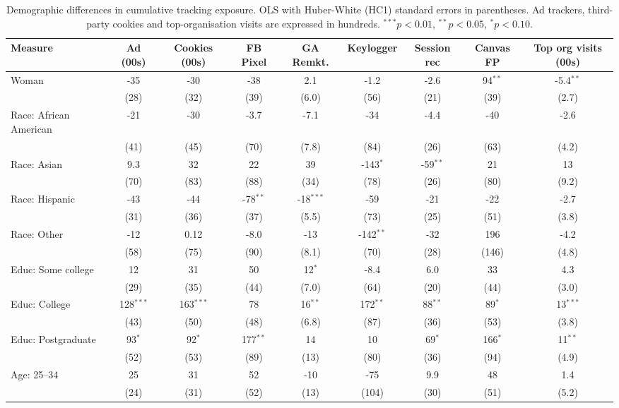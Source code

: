 \begin{table}[htbp]
\centering
\caption{Demographic differences in cumulative tracking exposure. OLS with Huber-White (HC1) standard errors in parentheses. Ad trackers, third-party cookies and top-organisation visits are expressed in hundreds. $^{***}p<0.01$, $^{**}p<0.05$, $^{*}p<0.10$.}
\label{tab:demo_differences_cum_exposure}
\begin{adjustbox}{max width=\textwidth}
\begin{tabular}{lcccccccc}
\toprule
Measure & Ad (00s) & Cookies (00s) & FB Pixel & GA Remkt. & Keylogger & Session rec & Canvas FP & Top org visits (00s) \\
\midrule
Woman & -35 & -30 & -38 & 2.1 & -1.2 & -2.6 & 94$^{**}$ & -5.4$^{**}$ \\
 & (28) & (32) & (39) & (6.0) & (56) & (21) & (39) & (2.7) \\
Race: African American & -21 & -30 & -3.7 & -7.1 & -34 & -4.4 & -40 & -2.6 \\
 & (41) & (45) & (70) & (7.8) & (84) & (26) & (63) & (4.2) \\
Race: Asian & 9.3 & 32 & 22 & 39 & -143$^{*}$ & -59$^{**}$ & 21 & 13 \\
 & (70) & (83) & (88) & (34) & (78) & (26) & (80) & (9.2) \\
Race: Hispanic & -43 & -44 & -78$^{**}$ & -18$^{***}$ & -59 & -21 & -22 & -2.7 \\
 & (31) & (36) & (37) & (5.5) & (73) & (25) & (51) & (3.8) \\
Race: Other & -12 & 0.12 & -8.0 & -13 & -142$^{**}$ & -32 & 196 & -4.2 \\
 & (58) & (75) & (90) & (8.1) & (70) & (28) & (146) & (4.8) \\
Educ: Some college & 12 & 31 & 50 & 12$^{*}$ & -8.4 & 6.0 & 33 & 4.3 \\
 & (29) & (35) & (44) & (7.0) & (64) & (20) & (44) & (3.0) \\
Educ: College & 128$^{***}$ & 163$^{***}$ & 78 & 16$^{**}$ & 172$^{**}$ & 88$^{**}$ & 89$^{*}$ & 13$^{***}$ \\
 & (43) & (50) & (48) & (6.8) & (87) & (36) & (53) & (3.8) \\
Educ: Postgraduate & 93$^{*}$ & 92$^{*}$ & 177$^{**}$ & 14 & 10 & 69$^{*}$ & 166$^{*}$ & 11$^{**}$ \\
 & (52) & (53) & (89) & (13) & (80) & (36) & (94) & (4.9) \\
Age: 25--34 & 25 & 31 & 52 & -10 & -75 & 9.9 & 48 & 1.4 \\
 & (24) & (31) & (52) & (13) & (104) & (30) & (51) & (5.2) \\

\end{tabular}
\end{adjustbox}
\end{table}
